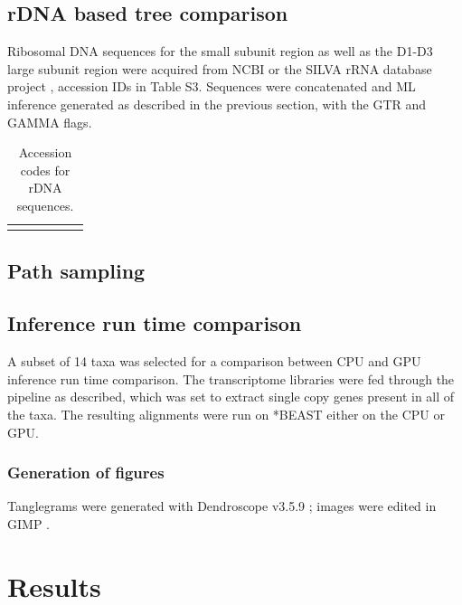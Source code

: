 \documentclass[12pt]{article}
\begin{document}
\subsection*{rDNA based tree comparison}
Ribosomal DNA sequences for the small subunit region as well as the D1-D3 large subunit region were acquired from NCBI \cite{coordinators2017database} or the SILVA rRNA database project \cite{silvaproj}, accession IDs in Table S3. 
Sequences were concatenated and ML inference generated as described in the previous section, with the GTR and GAMMA flags.

\FloatBarrier
\begin{longtable}{  | p{3cm} |p{2cm} | p{2cm} | p{2cm} | p{2cm} | p{2cm} |}
\caption{Accession codes for rDNA sequences.}\\
\hline
\label{tbl:rDNA}
\end{longtable}

\subsection*{Path sampling}

\subsection*{Inference run time comparison}
A subset of 14 taxa was selected for a comparison between CPU and GPU inference run time comparison. 
The transcriptome libraries were fed through the pipeline as described, which was set to extract single copy genes present in all of the taxa. 
The resulting alignments were run on *BEAST either on the CPU or GPU.

\subsubsection*{Generation of figures}
Tanglegrams were generated with Dendroscope v3.5.9 \cite{huson2007dendroscope}; images were edited in GIMP \cite{gimp}.
\newpage
\section{Results}
\end{document}
